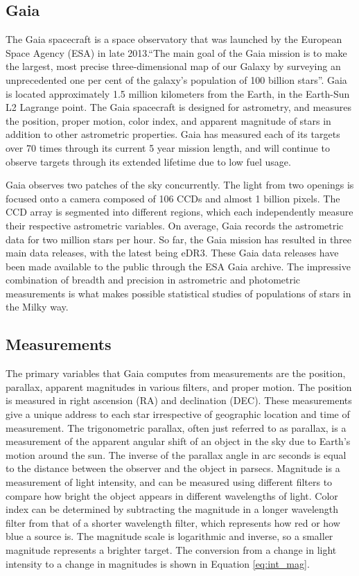 \documentclass[onecolumn,table,xcdraw,super]{aastex631}
\begin{document}
\subsection{Gaia} \label{sec:Gaia}
The Gaia spacecraft is a space observatory that was launched by the European Space Agency (ESA) in late 2013.``The main goal of the Gaia mission is to make the largest, most precise three-dimensional map of our Galaxy by surveying an unprecedented one per cent of the galaxy's population of 100 billion stars''\protect\cite{ESA}. Gaia is located approximately 1.5 million kilometers from the Earth, in the Earth-Sun L2 Lagrange point\protect\cite{ESA}. The Gaia spacecraft is designed for astrometry, and measures the position, proper motion, color index, and apparent magnitude of stars in addition to other astrometric properties. Gaia has measured each of its targets over 70 times through its current 5 year mission length, and will continue to observe targets through its extended lifetime due to low fuel usage\protect\cite{ESA}. 

Gaia observes two patches of the sky concurrently. The light from two openings is focused onto a camera composed of 106 CCDs and almost 1 billion pixels\protect\cite{GaiaSpec}. The CCD array is segmented into different regions, which each independently measure their respective astrometric variables. On average, Gaia records the astrometric data for two million stars per hour\protect\cite{GaiaSpec}. So far, the Gaia mission has resulted in three main data releases, with the latest being eDR3. These Gaia data releases have been made available to the public through the ESA Gaia archive\protect\cite{GaiaData}. The impressive combination of breadth and precision in astrometric and photometric measurements is what makes possible statistical studies of populations of stars in the Milky way.

\subsection{Measurements} \label{sec:measurements}
The primary variables that Gaia computes from measurements are the position, parallax, apparent magnitudes in various filters, and proper motion. The position is measured in right ascension (RA) and declination (DEC). These measurements give a unique address to each star irrespective of geographic location and time of measurement. The trigonometric parallax, often just referred to as parallax, is a measurement of the apparent angular shift of an object in the sky due to Earth's motion around the sun. The inverse of the parallax angle in arc seconds is equal to the distance between the observer and the object in parsecs. Magnitude is a measurement of light intensity, and can be measured using different filters to compare how bright the object appears in different wavelengths of light. Color index can be determined by subtracting the magnitude in a longer wavelength filter from that of a shorter wavelength filter, which represents how red or how blue a source is. The magnitude scale is logarithmic and inverse, so a smaller magnitude represents a brighter target. The conversion from a change in light intensity to a change in magnitudes is shown in Equation \ref{eq:int_mag}.
\end{document}

